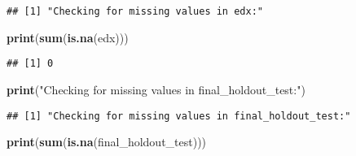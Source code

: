\documentclass[
]{article}
\newenvironment{Shaded}{\begin{snugshade}}{\end{snugshade}}
\newcommand{\CommentTok}[1]{\textcolor[rgb]{0.56,0.35,0.01}{\textit{#1}}}
\newcommand{\ControlFlowTok}[1]{\textcolor[rgb]{0.13,0.29,0.53}{\textbf{#1}}}
\newcommand{\FunctionTok}[1]{\textcolor[rgb]{0.13,0.29,0.53}{\textbf{#1}}}
\newcommand{\NormalTok}[1]{#1}
\newcommand{\OtherTok}[1]{\textcolor[rgb]{0.56,0.35,0.01}{#1}}
\newcommand{\SpecialCharTok}[1]{\textcolor[rgb]{0.81,0.36,0.00}{\textbf{#1}}}
\newcommand{\StringTok}[1]{\textcolor[rgb]{0.31,0.60,0.02}{#1}}
\begin{document}
\begin{Shaded}
\end{Shaded}

\begin{verbatim}
## [1] "Checking for missing values in edx:"
\end{verbatim}

\begin{Shaded}
\begin{Highlighting}[]
\FunctionTok{print}\NormalTok{(}\FunctionTok{sum}\NormalTok{(}\FunctionTok{is.na}\NormalTok{(edx)))}
\end{Highlighting}
\end{Shaded}

\begin{verbatim}
## [1] 0
\end{verbatim}

\begin{Shaded}
\begin{Highlighting}[]
\FunctionTok{print}\NormalTok{(}\StringTok{"Checking for missing values in final\_holdout\_test:"}\NormalTok{)}
\end{Highlighting}
\end{Shaded}

\begin{verbatim}
## [1] "Checking for missing values in final_holdout_test:"
\end{verbatim}

\begin{Shaded}
\begin{Highlighting}[]
\FunctionTok{print}\NormalTok{(}\FunctionTok{sum}\NormalTok{(}\FunctionTok{is.na}\NormalTok{(final\_holdout\_test)))}
\end{Highlighting}
\end{Shaded}
\end{document}
